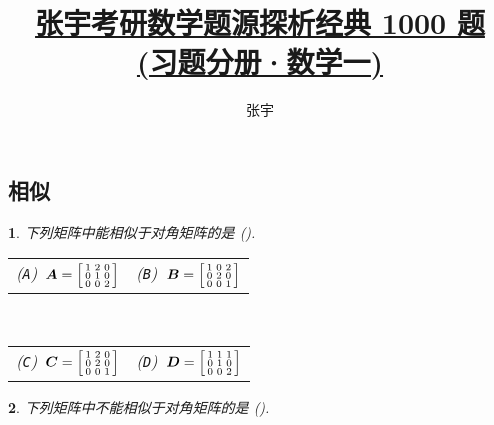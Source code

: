 \documentclass[openany,twocolumn]{ctexbook}
\title{\href{https://github.com/sikouhjw/zhangyu1000}{张宇考研数学题源探析经典 1000 题\\(习题分册·数学一)}}
\author{张宇}
\makeatletter
\numberwithin{figure}{section}
\theoremstyle{change}
\theoremstyle{change}
\newtheorem{titwo}{}
\def\kuo{ \mbox{(\hspace{1pc})}}
\newcommand{\twoch}[4]{\noindent\begin{tabular}{*{2}{@{}p{3.94cm}}}(\texttt{A})~#1 & (\texttt{B})~#2\end{tabular}\\\begin{tabular}{*{2}{@{}p{3.94cm}}}(\texttt{C})~#3 & (\texttt{D})~#4\end{tabular}}  %
\makeatother
\begin{document}
	
	\subsection{相似}
	\begin{titwo}
		下列矩阵中能相似于对角矩阵的是 \kuo.

		\twoch{$\bm A = \begin{bsmallmatrix}
			1 & 2 & 0 \\
			0 & 1 & 0 \\
			0 & 0 & 2
		\end{bsmallmatrix}$}{$\bm B = \begin{bsmallmatrix}
			1 & 0 & 2 \\
			0 & 2 & 0 \\
			0 & 0 & 1
		\end{bsmallmatrix}$}{$\bm C = \begin{bsmallmatrix}
			1 & 2 & 0 \\
			0 & 2 & 0 \\
			0 & 0 & 1
		\end{bsmallmatrix}$}{$\bm D = \begin{bsmallmatrix}
			1 & 1 & 1 \\
			0 & 1 & 0 \\
			0 & 0 & 2
		\end{bsmallmatrix}$}
	\end{titwo}

	\begin{titwo}
		下列矩阵中不能相似于对角矩阵的是 \kuo.
	\end{titwo}
\end{document}
